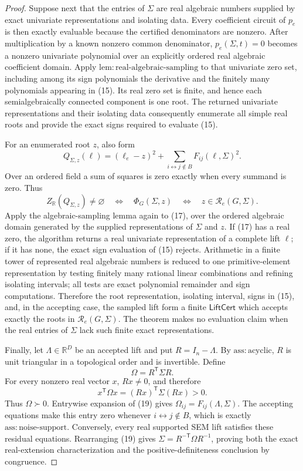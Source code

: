 \documentclass{article}
\begin{document}
\begin{proof}
Suppose next that the entries of \(\Sigma\) are real algebraic numbers supplied by exact univariate representations and isolating data.  Every coefficient circuit of \(p_e\) is then exactly evaluable because the certified denominators are nonzero.  After multiplication by a known nonzero common denominator, \(p_e(\Sigma,t)=0\) becomes a nonzero univariate polynomial over an explicitly ordered real algebraic coefficient domain.  Apply \(\mathrm{lem:real\mbox{-}algebraic\mbox{-}sampling}\) to that univariate zero set, including among its sign polynomials the derivative and the finitely many polynomials appearing in (15).  Its real zero set is finite, and hence each semialgebraically connected component is one root.  The returned univariate representations and their isolating data consequently enumerate all simple real roots and provide the exact signs required to evaluate (15).

For an enumerated root \(z\), also form
\[
 Q_{\Sigma,z}(\ell)
 =(\ell_e-z)^2+
 \sum_{i\leftrightarrow j\notin B}F_{ij}(\ell,\Sigma)^2.
\tag{17}
\]
Over an ordered field a sum of squares is zero exactly when every summand is zero.  Thus
\[
 Z_{\mathbb R}(Q_{\Sigma,z})\ne\varnothing
 \quad\Longleftrightarrow\quad
 \Phi_G(\Sigma,z)
 \quad\Longleftrightarrow\quad
 z\in\mathcal R_e(G,\Sigma).
\tag{18}
\]
Apply the algebraic-sampling lemma again to (17), over the ordered algebraic domain generated by the supplied representations of \(\Sigma\) and \(z\).  If (17) has a real zero, the algorithm returns a real univariate representation of a complete lift \(\ell\); if it has none, the exact sign evaluation of (15) rejects.  Arithmetic in a finite tower of represented real algebraic numbers is reduced to one primitive-element representation by testing finitely many rational linear combinations and refining isolating intervals; all tests are exact polynomial remainder and sign computations.  Therefore the root representation, isolating interval, signs in (15), and, in the accepting case, the sampled lift form a finite \(\mathsf{LiftCert}\) which accepts exactly the roots in \(\mathcal R_e(G,\Sigma)\).  The theorem makes no evaluation claim when the real entries of \(\Sigma\) lack such finite exact representations.

Finally, let \(\Lambda\in\mathbb R^D\) be an accepted lift and put \(R=I_n-\Lambda\).  By \(\mathrm{ass:acyclic}\), \(R\) is unit triangular in a topological order and is invertible.  Define
\[
 \Omega=R^{\mathsf T}\Sigma R.
\tag{19}
\]
For every nonzero real vector \(x\), \(Rx\ne0\), and therefore
\[
 x^{\mathsf T}\Omega x=(Rx)^{\mathsf T}\Sigma(Rx)>0.
\tag{20}
\]
Thus \(\Omega\succ0\).  Entrywise expansion of (19) gives \(\Omega_{ij}=F_{ij}(\Lambda,\Sigma)\).  The accepting equations make this entry zero whenever \(i\leftrightarrow j\notin B\), which is exactly \(\mathrm{ass:noise\mbox{-}support}\).  Conversely, every real supported SEM lift satisfies these residual equations.  Rearranging (19) gives \(\Sigma=R^{-\mathsf T}\Omega R^{-1}\), proving both the exact real-extension characterization and the positive-definiteness conclusion by congruence.
\end{proof}
\end{document}
